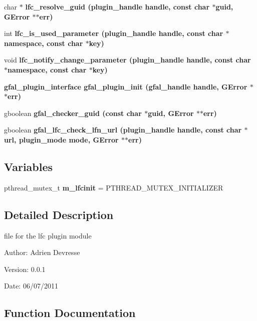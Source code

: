 \begin{CompactItemize}
\item 
char $\ast$ \bf{lfc\_\-resolve\_\-guid} (plugin\_\-handle handle, const char $\ast$guid, GError $\ast$$\ast$err)
\item 
int \bf{lfc\_\-is\_\-used\_\-parameter} (plugin\_\-handle handle, const char $\ast$namespace, const char $\ast$key)
\item 
void \bf{lfc\_\-notify\_\-change\_\-parameter} (plugin\_\-handle handle, const char $\ast$namespace, const char $\ast$key)
\item 
\bf{gfal\_\-plugin\_\-interface} \bf{gfal\_\-plugin\_\-init} (gfal\_\-handle handle, GError $\ast$$\ast$err)
\item 
gboolean \bf{gfal\_\-checker\_\-guid} (const char $\ast$guid, GError $\ast$$\ast$err)
\item 
gboolean \bf{gfal\_\-lfc\_\-check\_\-lfn\_\-url} (plugin\_\-handle handle, const char $\ast$url, plugin\_\-mode mode, GError $\ast$$\ast$err)
\end{CompactItemize}
\subsection*{Variables}
\begin{CompactItemize}
\item 
pthread\_\-mutex\_\-t \textbf{m\_\-lfcinit} = PTHREAD\_\-MUTEX\_\-INITIALIZER\label{gfal__common__lfc_8c_a683cb37b7f14c7d477e4653816d20df}

\end{CompactItemize}


\subsection{Detailed Description}
file for the lfc plugin module 

\begin{Desc}
\item[Author:]Adrien Devresse \end{Desc}
\begin{Desc}
\item[Version:]0.0.1 \end{Desc}
\begin{Desc}
\item[Date:]06/07/2011 \end{Desc}


\subsection{Function Documentation}
